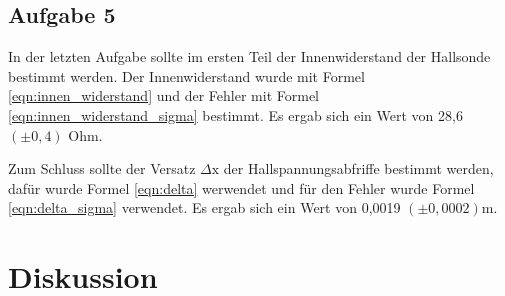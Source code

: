 \documentclass[12pt]{scrartcl}
\begin{document}
\subsection{Aufgabe 5}
In der letzten Aufgabe sollte im ersten Teil der Innenwiderstand der Hallsonde bestimmt werden. Der Innenwiderstand wurde mit Formel \ref{eqn:innen_widerstand} und der Fehler mit Formel \ref{eqn:innen_widerstand_sigma} bestimmt. Es ergab sich ein Wert von 28,6 $(\pm 0,4)$ Ohm.

Zum Schluss sollte der Versatz $\Delta\text{x}$ der Hallspannungsabfriffe bestimmt werden, dafür wurde Formel \ref{eqn:delta} werwendet und für den Fehler wurde Formel \ref{eqn:delta_sigma} verwendet. Es ergab sich ein Wert von 0,0019 $(\pm 0,0002)$m.

\newpage
\section{Diskussion}
\end{document}
